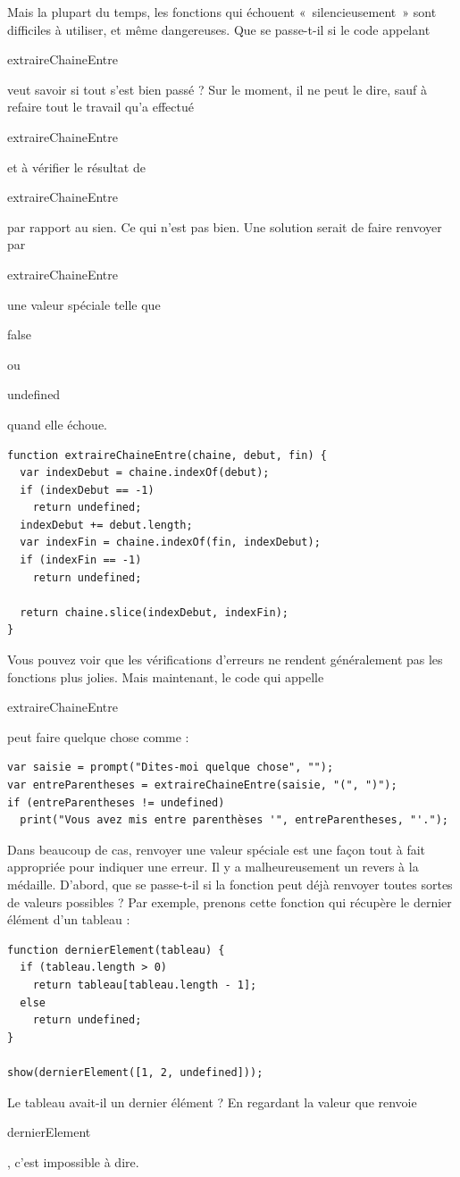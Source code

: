 \documentclass{FramateX}
\renewcommand{\texttt}[1]{\begin{sffamily}{#1}\end{sffamily}}
\begin{document}
Mais la plupart du temps, les fonctions qui échouent «~silencieusement~»
sont difficiles à utiliser, et même dangereuses. Que se passe-t-il si le
code appelant \texttt{extraireChaineEntre} veut savoir si tout s'est
bien passé ? Sur le moment, il ne peut le dire, sauf à refaire tout le
travail qu'a effectué \texttt{extraireChaineEntre} et à vérifier le
résultat de \texttt{extraireChaineEntre} par rapport au sien. Ce qui
n'est pas bien. Une solution serait de faire renvoyer par
\texttt{extraireChaineEntre} une valeur spéciale telle que
\texttt{false} ou \texttt{undefined} quand elle échoue.

\begin{lstlisting}
function extraireChaineEntre(chaine, debut, fin) {
  var indexDebut = chaine.indexOf(debut);
  if (indexDebut == -1)
    return undefined;
  indexDebut += debut.length;
  var indexFin = chaine.indexOf(fin, indexDebut);
  if (indexFin == -1)
    return undefined;

  return chaine.slice(indexDebut, indexFin);
}
\end{lstlisting}
Vous pouvez voir que les vérifications d'erreurs ne rendent généralement
pas les fonctions plus jolies. Mais maintenant, le code qui appelle
\texttt{extraireChaineEntre} peut faire quelque chose comme :

\begin{lstlisting}
var saisie = prompt("Dites-moi quelque chose", "");
var entreParentheses = extraireChaineEntre(saisie, "(", ")");
if (entreParentheses != undefined)
  print("Vous avez mis entre parenthèses '", entreParentheses, "'.");
\end{lstlisting}
\begin{center}\end{center}

Dans beaucoup de cas, renvoyer une valeur spéciale est une façon tout à
fait appropriée pour indiquer une erreur. Il y a malheureusement un
revers à la médaille. D'abord, que se passe-t-il si la fonction peut
déjà renvoyer toutes sortes de valeurs possibles ? Par exemple, prenons
cette fonction qui récupère le dernier élément d'un tableau :

\begin{lstlisting}
function dernierElement(tableau) {
  if (tableau.length > 0)
    return tableau[tableau.length - 1];
  else
    return undefined;
}

show(dernierElement([1, 2, undefined]));
\end{lstlisting}
Le tableau avait-il un dernier élément ? En regardant la valeur que
renvoie \texttt{dernierElement}, c'est impossible à dire.
\end{document}
